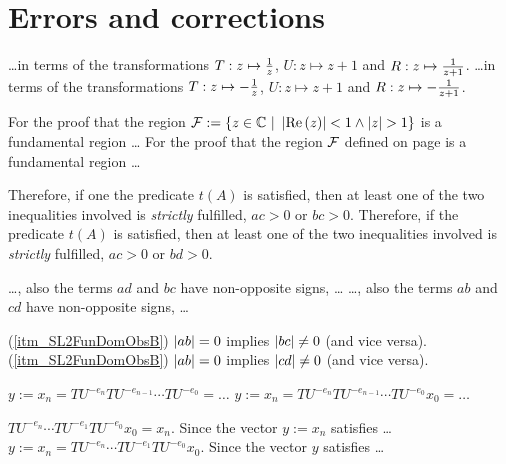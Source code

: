 \chapter{Errors and corrections}

\begin{description}
{\dots in terms of the transformations $T : z \mapsto \frac{1}{z}$, $U : z \mapsto z+1$ and $R : z \mapsto \frac{1}{z+1}$.}
{\dots in terms of the transformations $T : z \mapsto -\frac{1}{z}$, $U : z \mapsto z+1$ and $R : z \mapsto -\frac{1}{z+1}$.}

{For the proof that the region $\mathcal{F} := \{ z \in \mathbb{C} \ | \ \left|\operatorname{Re}\left(z\right)\right| < 1 \land \left|z\right| > 1 \}$ is a fundamental region \dots}
{For the proof that the region $\mathcal{F}$ defined on page \pageref{eqn_PSL2FunDom} is a fundamental region \dots}

{Therefore, if one the predicate $t(A)$ is satisfied, then at least one of the two inequalities involved is \emph{strictly} fulfilled, \ie $ac > 0$ or $bc > 0$.}
{Therefore, if the predicate $t(A)$ is satisfied, then at least one of the two inequalities involved is \emph{strictly} fulfilled, \ie $ac > 0$ or $bd > 0$.}

{\dots, \ie also the terms $ad$ and  $bc$ have non-opposite signs, \dots}
{\dots, \ie also the terms $ab$ and $cd$ have non-opposite signs, \dots}

{(\ref{itm_SL2FunDomObsB})\quad
$\left|ab\right| = 0$ implies $\left|bc\right| \ne 0$ (and vice versa).}
{(\ref{itm_SL2FunDomObsB})\quad
$\left|ab\right| = 0$ implies $\left|cd\right| \ne 0$ (and vice versa).}

{$y := x_n = TU^{-e_n} TU^{-e_{n-1}} \cdots TU^{-e_0} = \dots$}
{$y := x_n = TU^{-e_n} TU^{-e_{n-1}} \cdots TU^{-e_0} x_0 = \dots$}

{$TU^{-e_n} \cdots TU^{-e_1} TU^{-e_0} x_0 = x_n.$ \quad Since the vector $y := x_n$ satisfies \dots}
{$y := x_n = TU^{-e_n} \cdots TU^{-e_1} TU^{-e_0} x_0.$ \quad Since the vector $y$ satisfies \dots}
\end{description}
